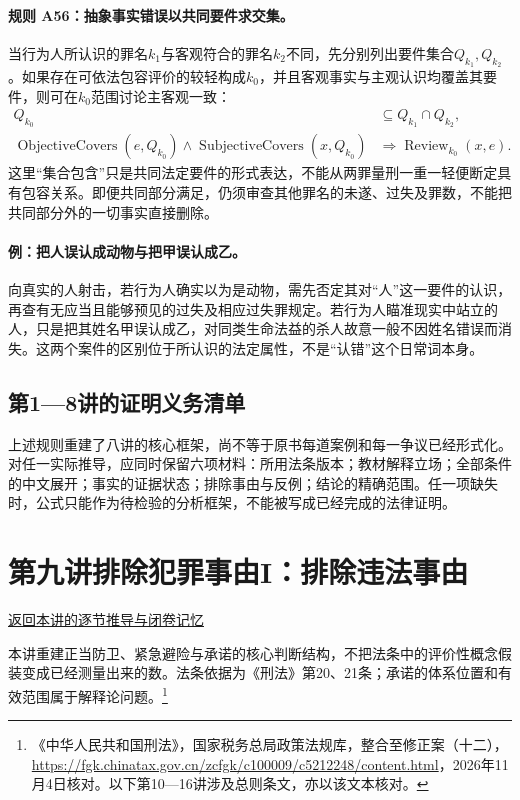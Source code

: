 \paragraph{规则 A56：抽象事实错误以共同要件求交集。}
当行为人所认识的罪名$k_1$与客观符合的罪名$k_2$不同，先分别列出要件集合$Q_{k_1},Q_{k_2}$。如果存在可依法包容评价的较轻构成$k_0$，并且客观事实与主观认识均覆盖其要件，则可在$k_0$范围讨论主客观一致：
\[
\begin{aligned}
Q_{k_0}&\subseteq Q_{k_1}\cap Q_{k_2},\\
\operatorname{ObjectiveCovers}(e,Q_{k_0})
\land\operatorname{SubjectiveCovers}(x,Q_{k_0})
&\Longrightarrow\operatorname{Review}_{{k_0}}(x,e).
\end{aligned}
\]
这里“集合包含”只是共同法定要件的形式表达，不能从两罪量刑一重一轻便断定具有包容关系。即便共同部分满足，仍须审查其他罪名的未遂、过失及罪数，不能把共同部分外的一切事实直接删除。

\paragraph{例：把人误认成动物与把甲误认成乙。}
向真实的人射击，若行为人确实以为是动物，需先否定其对“人”这一要件的认识，再查有无应当且能够预见的过失及相应过失罪规定。若行为人瞄准现实中站立的人，只是把其姓名甲误认成乙，对同类生命法益的杀人故意一般不因姓名错误而消失。这两个案件的区别位于所认识的法定属性，不是“认错”这个日常词本身。

\subsection{第1—8讲的证明义务清单}
上述规则重建了八讲的核心框架，尚不等于原书每道案例和每一争议已经形式化。对任一实际推导，应同时保留六项材料：所用法条版本；教材解释立场；全部条件的中文展开；事实的证据状态；排除事由与反例；结论的精确范围。任一项缺失时，公式只能作为待检验的分析框架，不能被写成已经完成的法律证明。



\section{第九讲\quad 排除犯罪事由I：排除违法事由}

\label{ref:lecture:09}

\noindent\hyperref[lecture:09]{返回本讲的逐节推导与闭卷记忆}

本讲重建正当防卫、紧急避险与承诺的核心判断结构，不把法条中的评价性概念假装变成已经测量出来的数。法条依据为《刑法》第20、21条；承诺的体系位置和有效范围属于解释论问题。\footnote{《中华人民共和国刑法》，国家税务总局政策法规库，整合至修正案（十二），\url{https://fgk.chinatax.gov.cn/zcfgk/c100009/c5212248/content.html}，2026年11月4日核对。以下第10—16讲涉及总则条文，亦以该文本核对。}

